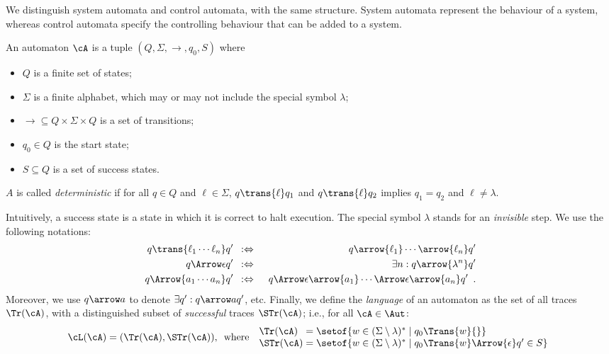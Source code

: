 We distinguish system automata and control automata, with the same structure. System automata represent the behaviour of a system, whereas control automata specify the controlling behaviour that can be added to a system.
%
%
\begin{definition}[automaton]\label{def:aut}
An automaton $\cA$ is a tuple $(Q, \Sigma, \rightarrow, q_0, S)$ where
\begin{itemize}
\item $Q$ is a finite set of states;
\item $\Sigma$ is a finite alphabet, which may or may not include the special
  symbol $\lambda$;
\item ${\rightarrow} \subseteq Q \times \Sigma \times Q$ is a set of
  transitions;
\item $q_0 \in Q$ is the start state;
\item $S \subseteq Q$ is a set of success states.
\end{itemize}
$A$ is called \emph{deterministic} if for all $q\in Q$ and $\ell\in \Sigma$, $q
\trans{\ell} q_1$ and $q \trans{\ell} q_2$ implies $q_1 = q_2$ and $\ell \neq \lambda$.
\end{definition}
%
Intuitively, a success state is a state in which it is correct to halt
execution. The special symbol $\lambda$ stands for an \emph{invisible} step. We
use the following notations:
%
\begin{eqnarray*}
q \trans{\ell_1\cdots \ell_n} q'
  & \enspace:\Leftrightarrow\enspace
  & q \arrow{\ell_1} \cdots \arrow{\ell_n} q' \\
q \Arrow\epsilon q'
  & \enspace:\Leftrightarrow\enspace
  & \exists n: q \arrow{\lambda^n} q' \\
q \Arrow{a_1\cdots a_n} q'
  & \enspace:\Leftrightarrow\enspace
  & q \Arrow\epsilon \arrow{a_1} \cdots \Arrow\epsilon \arrow{a_n} q' \enspace.
\end{eqnarray*}
%
Moreover, we use $q\arrow a{}$ to denote $\exists q':q\arrow a q'$, etc.
Finally, we define the \emph{language} of an automaton as the set of all
traces $\Tr(\cA)$, with a distinguished subset of \emph{successful} traces $\STr(\cA)$; i.e., for all
$\cA\in \Aut$:
%
\[%
   \cL(\cA) = (\Tr(\cA),\STr(\cA)), \enspace\text{where}\enspace
   \begin{array}{l@{{\;}}l}
   \Tr(\cA)
       & = \setof{w \in (\Sigma\setminus\lambda)^* \mid q_0\Trans{w}{}} \\
   \STr(\cA)
       & = \setof{w \in (\Sigma\setminus\lambda)^* \mid q_0\Trans{w }\Arrow{\epsilon} q'\in S} \\
   \end{array}
\]

